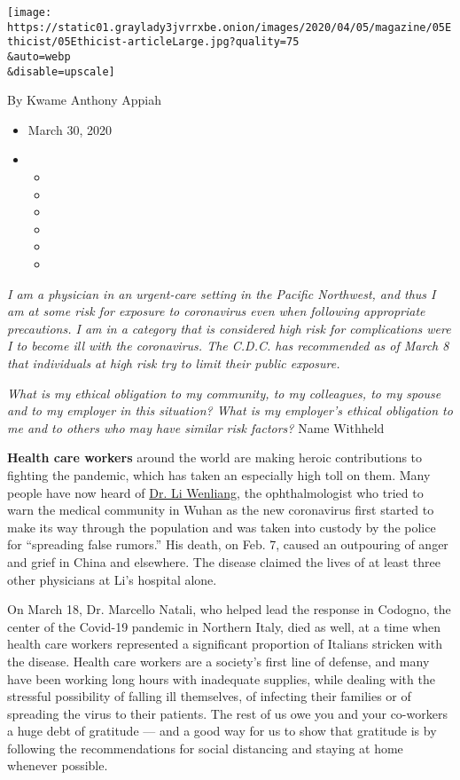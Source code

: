 \texttt{[image: https://static01.graylady3jvrrxbe.onion/images/2020/04/05/magazine/05Ethicist/05Ethicist-articleLarge.jpg?quality=75\\\&auto=webp\\\&disable=upscale]}

By Kwame Anthony Appiah

\begin{itemize}
\item
  March 30, 2020
\item
  \begin{itemize}
  \item
  \item
  \item
  \item
  \item
  \item
  \end{itemize}
\end{itemize}

\emph{I am a physician in an urgent-care setting in the Pacific
Northwest, and thus I am at some risk for exposure to coronavirus even
when following appropriate precautions. I am in a category that is
considered high risk for complications were I to become ill with the
coronavirus. The C.D.C. has recommended as of March 8 that individuals
at high risk try to limit their public exposure.}

\emph{What is my ethical obligation to my community, to my colleagues,
to my spouse and to my employer in this situation? What is my employer's
ethical obligation to me and to others who may have similar risk
factors?} Name Withheld

\textbf{Health care workers} around the world are making heroic
contributions to fighting the pandemic, which has taken an especially
high toll on them. Many people have now heard of
\href{https://www.nytimes3xbfgragh.onion/2020/02/07/world/asia/china-coronavirus-doctor-death.html}{Dr.
Li Wenliang}, the ophthalmologist who tried to warn the medical
community in Wuhan as the new coronavirus first started to make its way
through the population and was taken into custody by the police for
``spreading false rumors.'' His death, on Feb. 7, caused an outpouring
of anger and grief in China and elsewhere. The disease claimed the lives
of at least three other physicians at Li's hospital alone.

On March 18, Dr. Marcello Natali, who helped lead the response in
Codogno, the center of the Covid-19 pandemic in Northern Italy, died as
well, at a time when health care workers represented a significant
proportion of Italians stricken with the disease. Health care workers
are a society's first line of defense, and many have been working long
hours with inadequate supplies, while dealing with the stressful
possibility of falling ill themselves, of infecting their families or of
spreading the virus to their patients. The rest of us owe you and your
co-workers a huge debt of gratitude --- and a good way for us to show
that gratitude is by following the recommendations for social distancing
and staying at home whenever possible.

